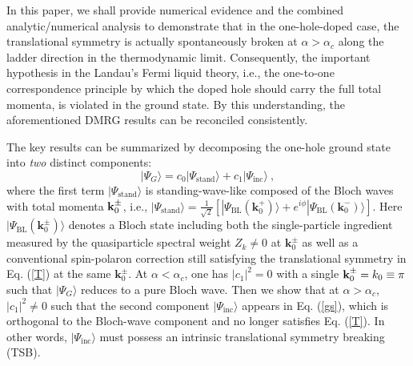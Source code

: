 \documentclass[aps,prb,twocolumn,notitlepage,superscriptaddress,showpacs]{revtex4-1}
\begin{document}
In this paper, we shall provide numerical evidence and the combined analytic/numerical analysis to demonstrate that in the one-hole-doped case, the translational symmetry is actually spontaneously broken at $\alpha>\alpha_c$ along the ladder direction in the thermodynamic limit. Consequently, the important hypothesis in the Landau's Fermi liquid theory, i.e., the one-to-one correspondence principle by which the doped hole should carry the full total momenta, is violated in the ground state. By this understanding, the aforementioned DMRG results can be reconciled consistently.

The key results can be summarized by decomposing the one-hole ground state into \emph{two} distinct components:
\begin{equation}\label{gs}
|\Psi_{G}\rangle=c_0|\Psi_{\mathrm {stand}}\rangle+c_1|\Psi_{\mathrm {inc}}\rangle ~,
\end{equation}
where the first term $|\Psi_{\mathrm {stand}}\rangle $ is standing-wave-like composed of the Bloch waves with total momenta ${\textbf k}_0^{\pm}$, i.e., $|\Psi_{\mathrm {stand}}\rangle =\frac{1}{\sqrt{2}}\left[|\Psi_{\mathrm {BL}}({\textbf{k}}^+_0)\rangle+e^{i\phi} |\Psi_{\mathrm {BL}}({ \textbf{k}}^-_0)\rangle \right] $. Here $|\Psi_{\mathrm {BL}}({ \textbf{k}}^{\pm}_0)\rangle$ denotes a Bloch state including both the single-particle ingredient measured by the quasiparticle spectral weight $Z_k\neq 0$ at ${\textbf{k}}_0^{\pm}$ as well as a conventional spin-polaron correction \cite{Lee2006,SCBA1,SCBA2,SCBA3,SCBA4} still satisfying the translational symmetry in Eq. (\ref{T}) at the same ${\textbf{k}}_0^{\pm}$.
At $\alpha<\alpha_c$, one has $|c_1|^2=0$ with a single ${\textbf k}_0^{\pm}=k_0\equiv\pi$ such that $|\Psi_{G}\rangle$ reduces to a pure Bloch wave. Then we show that at $\alpha>\alpha_c$,  $|c_1|^2\neq 0$ such that the second component  $|\Psi_{\mathrm {inc}} \rangle$ appears in Eq. (\ref{gs}), which is orthogonal to the Bloch-wave component and no longer satisfies Eq. (\ref{T}). In other words, $|\Psi_{\mathrm {inc}} \rangle$ must possess an intrinsic translational symmetry breaking (TSB). 
\end{document}
